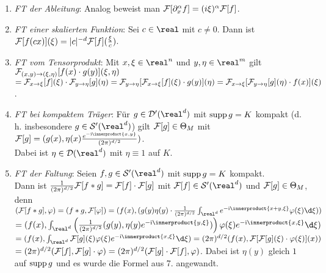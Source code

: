 \begin{enumerate}
    \item
    \emph{FT der Ableitung}:
    Analog beweist man $\mathcal{F}[\partial_x^\alpha f] = (i\xi)^\alpha \mathcal{F}[f]$.

    \item
    \emph{FT einer skalierten Funktion}:
    Sei $c \in \real$ mit $c \not= 0$.
    Dann ist $\mathcal{F}[f(cx)](\xi) = |c|^{-d} \mathcal{F}[f](\frac{\xi}{c})$.

    \item
    \emph{FT vom Tensorprodukt}:
    Mit $x, \xi \in \real^n$ und $y, \eta \in \real^m$ gilt
    $\mathcal{F}_{(x, y) \to (\xi, \eta)}[f(x) \cdot g(y)](\xi, \eta)$\\
    $= \mathcal{F}_{x \to \xi}[f](\xi) \cdot \mathcal{F}_{y \to \eta}[g](\eta) =
    \mathcal{F}_{y \to \eta}[\mathcal{F}_{x \to \xi}[f](\xi) \cdot g(y)](\eta) =
    \mathcal{F}_{x \to \xi}[\mathcal{F}_{y \to \eta}[g](\eta) \cdot f(x)](\xi)$.

    \item
    \emph{FT bei kompaktem Träger}:
    Für $g \in \D'(\real^d)$ mit $\operatorname{supp} g = K$ kompakt
    (d.\,h. insbesondere $g \in \S'(\real^d)$) gilt
    $\mathcal{F}[g] \in \Theta_M$ mit
    $\F[g] = (g(x), \eta(x)\frac{e^{-\i\innerproduct{x, y}}}{(2\pi)^{d/2}})$.\\
    Dabei ist $\eta \in \D(\real^d)$ mit $\eta \equiv 1$ auf $K$.

    \item
    \emph{FT der Faltung}:
    Seien $f, g \in \S'(\real^d)$ mit $\operatorname{supp} g = K$ kompakt.\\
    Dann ist $\frac{1}{(2\pi)^{d/2}} \mathcal{F}[f \ast g] = \mathcal{F}[f] \cdot \mathcal{F}[g]$
    mit $\F[f] \in \S'(\real^d)$ und $\mathcal{F}[g] \in \Theta_M$, denn\\
    $(\F[f \ast g], \varphi) = (f \ast g, \F[\varphi]) =
    (f(x), (g(y)\eta(y) \cdot \frac{1}{(2\pi)^{d/2}}
    \int_{\real^d} e^{-\i\innerproduct{x + y, \xi}}\varphi(\xi)\d\xi))$\\
    $= (f(x), \int_{\real^d}
    \left(\frac{1}{(2\pi)^{d/2}} (g(y), \eta(y)e^{-\i\innerproduct{y, \xi}})\right)
    \varphi(\xi)e^{-\i\innerproduct{x, \xi}}\d\xi)$\\
    $= (f(x), \int_{\real^d} \F[g](\xi)\varphi(\xi)e^{-\i\innerproduct{x, \xi}}\d\xi) =
    (2\pi)^{d/2} (f(x), \F[\F[g](\xi) \cdot \varphi(\xi)](x))$\\
    $= (2\pi)^{d/2} (\mathcal{F}[f], \mathcal{F}[g] \cdot \varphi) =
    (2\pi)^{d/2} (\mathcal{F}[g] \cdot \mathcal{F}[f], \varphi)$.
    Dabei ist $\eta(y)$ gleich $1$ auf $\operatorname{supp} g$ und es wurde die Formel aus
    7. angewandt.
\end{enumerate}

